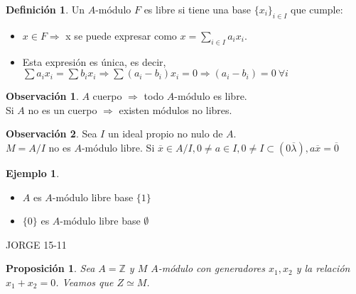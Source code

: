 \documentclass{article}
\theoremstyle{theorem-style}  %
\newtheorem{proposition}[theorem]{Proposición}
\theoremstyle{definition}
\newtheorem{definition}{Definición}[section]
\newtheorem*{observation}{Observación} %
\theoremstyle{example-style}
\newtheorem{example}{Ejemplo}[section]
\begin{document}
\begin{definition}
	Un $ A $-módulo $ F $ es libre si tiene una base $\{x_i\}_{i\in I}$ que cumple:
	\begin{itemize}
		\item $x\in F\Rightarrow$ x se puede expresar como $x=\sum_{i\in I}a_i x_i$.
		\item Esta expresión es única, es decir, $\sum a_i x_i=\sum b_i x_i \Rightarrow \sum (a_i-b_i)x_i=0\Rightarrow (a_i-b_i)=0 \ \forall i$
	\end{itemize}
\end{definition}
\begin{observation}
	$ A $ cuerpo $ \Rightarrow $ todo $ A $-módulo es libre. \\
	Si $ A $ no es un cuerpo $ \Rightarrow $ existen módulos no libres.
\end{observation}
\begin{observation}
	Sea $ I $ un ideal propio no nulo de $ A $.\\
	$ M=A/I $ no es $ A $-módulo libre.
	Si $ \overline{x} \in A/I, 0\neq a\in I, 0\neq I \subset (0\overline{\lambda}), a\overline{x}=\overline{0} $
\end{observation}
\begin{example}
	\begin{itemize}
		\item $ A $ es $ A $-módulo libre base $ \{1\} $
		\item $ \{0\} $ es $ A $-módulo libre base $ \emptyset $
	\end{itemize}
\end{example}
JORGE 15-11


\begin{proposition}
	Sea $A=\mathbb{Z}$ y $M$ $A$-módulo con generadores $x_1,x_2$ y la relación $x_1+x_2=0$. Veamos que $Z\simeq M$.
\end{proposition}
\end{document}
